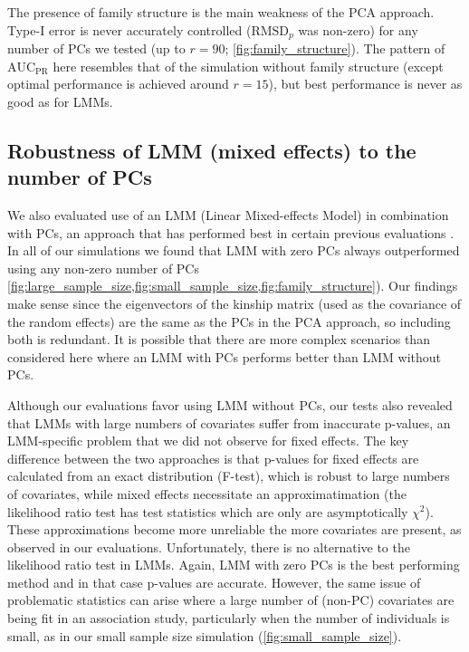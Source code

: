 \documentclass[11pt]{article}
\newcommand{\rmsd}{\text{RMSD}_p}
\newcommand{\auc}{\text{AUC}_\text{PR}}
\begin{document}
The presence of family structure is the main weakness of the PCA approach.
Type-I error is never accurately controlled ($\rmsd$ was non-zero) for any number of PCs we tested (up to $r=90$; \cref{fig:family_structure}).
The pattern of $\auc$ here resembles that of the simulation without family structure (except optimal performance is achieved around $r = 15$), but best performance is never as good as for LMMs.

\subsection{Robustness of LMM (mixed effects) to the number of PCs}

We also evaluated use of an LMM (Linear Mixed-effects Model) in combination with PCs, an approach that has performed best in certain previous evaluations \citep{zhao_arabidopsis_2007, price_new_2010}.
In all of our simulations we found that LMM with zero PCs always outperformed using any non-zero number of PCs \cref{fig:large_sample_size,fig:small_sample_size,fig:family_structure}).
Our findings make sense since the eigenvectors of the kinship matrix (used as the covariance of the random effects) are the same as the PCs in the PCA approach, so including both is redundant.
It is possible that there are more complex scenarios than considered here where an LMM with PCs performs better than LMM without PCs.

Although our evaluations favor using LMM without PCs, our tests also revealed that LMMs with large numbers of covariates suffer from inaccurate p-values, an LMM-specific problem that we did not observe for fixed effects.
The key difference between the two approaches is that p-values for fixed effects are calculated from an exact distribution (F-test), which is robust to large numbers of covariates, while mixed effects necessitate an approximatimation (the likelihood ratio test has test statistics which are only are asymptotically $\chi^2$).
These approximations become more unreliable the more covariates are present, as observed in our evaluations.
Unfortunately, there is no alternative to the likelihood ratio test in LMMs.
Again, LMM with zero PCs is the best performing method and in that case p-values are accurate.
However, the same issue of problematic statistics can arise where a large number of (non-PC) covariates are being fit in an association study, particularly when the number of individuals is small, as in our small sample size simulation (\cref{fig:small_sample_size}).
\end{document}
